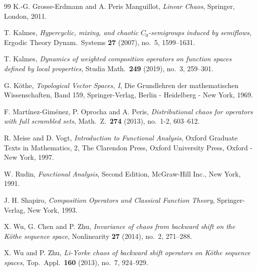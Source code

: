 \documentclass[12pt]{amsart}
\theoremstyle{theorem}
\theoremstyle{definition}
\theoremstyle{remark} \theoremstyle{question} \theoremstyle{example}
\begin{document}
\begin{thebibliography}{99}
 K.-G. Grosse-Erdmann and A. Peris Manguillot, 
    {\it Linear Chaos}, Springer, London, 2011.

 T. Kalmes,
    {\it Hypercyclic, mixing, and chaotic $C_0$-semigroups induced by semiflows},
    Ergodic Theory Dynam.\ Systems {\bf 27} (2007), no.\ 5, 1599--1631.

 T. Kalmes,
    {\it Dynamics of weighted composition operators on function spaces defined by local properties},
    Studia Math.\ {\bf 249} (2019), no.\ 3, 259--301.

 G. K\"othe,
    {\it Topological Vector Spaces, I}, Die Grundlehren der mathematischen Wissenschaften, Band 159,
    Springer-Verlag, Berlin - Heidelberg - New York, 1969.

 F. Mart\'inez-Gim\'enez, P. Oprocha and A. Peris,
    {\it Distributional chaos for operators with full scrambled sets}, Math.\ Z.\ {\bf 274} (2013), no.\ 1-2, 603--612.

 R. Meise and D. Vogt,
    {\it Introduction to Functional Analysis}, Oxford Graduate Texts in Mathematics, 2,
    The Clarendon Press, Oxford University Press, Oxford - New York, 1997.

 W. Rudin,
    {\it Functional Analysis}, Second Edition, McGraw-Hill Inc., New York, 1991.
    
 J. H. Shapiro,
    {\it Composition Operators and Classical Function Theory}, Springer-Verlag, New York, 1993.

 X. Wu, G. Chen and P. Zhu,
    {\it Invariance of chaos from backward shift on the K\"othe sequence space}, Nonlinearity {\bf 27} (2014), no.\ 2, 271--288.

 X. Wu and P. Zhu,
    {\it Li-Yorke chaos of backward shift operators on K\"othe sequence spaces}, Top.\ Appl.\ \textbf{160} (2013), no.\ 7, 924--929.

\end{thebibliography}
\end{document}
